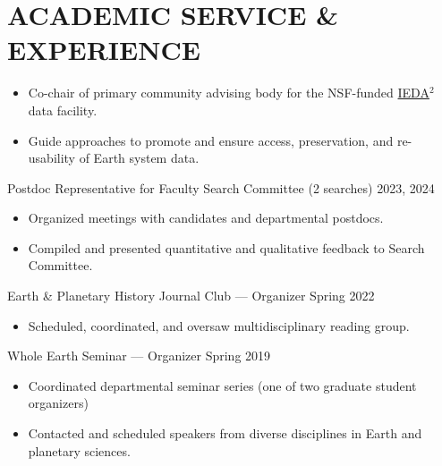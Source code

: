 \section*{ACADEMIC SERVICE \& EXPERIENCE}

\begin{itemize}
	\item Co-chair of primary community advising body for the NSF-funded \href{https://www.iedadata.org/}{IEDA$^2$} data facility.
	\item Guide approaches to promote and ensure access, preservation, and re-usability of Earth system data.
\end{itemize}

Postdoc Representative for Faculty Search Committee (2 searches) \hfill 2023, 2024
\begin{itemize}
	\item Organized meetings with candidates and departmental postdocs.
	\item Compiled and presented quantitative and qualitative feedback to Search Committee.
\end{itemize}\vspace*{1ex}

Earth \& Planetary History Journal Club --- Organizer 	 \hfill	Spring 2022
\begin{itemize}
	\item Scheduled, coordinated, and oversaw multidisciplinary reading group.
\end{itemize}

Whole Earth Seminar --- Organizer \hfill  Spring 2019
\begin{itemize}
	\item Coordinated departmental seminar series (one of two graduate student organizers)
	\item Contacted and scheduled speakers from diverse disciplines in Earth and planetary sciences.
\end{itemize}

